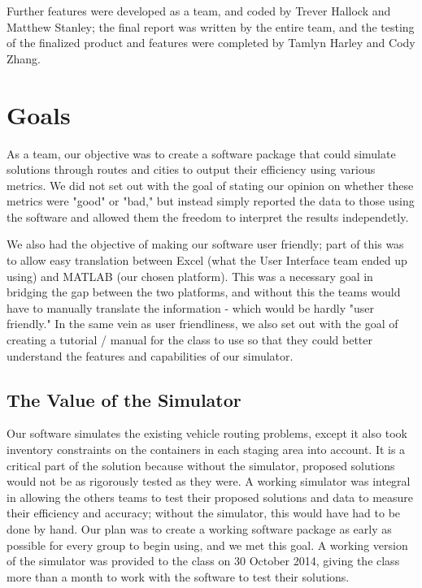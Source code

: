 \documentclass{article}
\begin{document}
Further features were developed as a team, and coded by Trever Hallock and Matthew Stanley; the final report was written by the entire team, and the testing of the finalized product and features were completed by Tamlyn Harley and Cody Zhang.


\section{Goals}

As a team, our objective was to create a software package that could simulate solutions through routes and cities to output their efficiency using various metrics.  We did not set out with the goal of stating our opinion on whether these metrics were "good" or "bad," but instead simply reported the data to those using the software and allowed them the freedom to interpret the results independetly. 

We also had the objective of making our software user friendly; part of this was to allow easy translation between Excel (what the User Interface team ended up using) and MATLAB (our chosen platform).  This was a necessary goal in bridging the gap between the two platforms, and without this the teams would have to manually translate the information - which would be hardly "user friendly."  In the same vein as user friendliness, we also set out with the goal of creating a tutorial / manual for the class to use so that they could better understand the features and capabilities of our simulator.


\subsection{The Value of the Simulator}

Our software simulates the existing vehicle routing problems, except it also took inventory constraints on the containers in each staging area into account. 
It is a critical part of the solution because without the simulator, proposed solutions would not be as rigorously tested as they were. 
A working simulator was integral in allowing the others teams to test their proposed solutions and data to measure their efficiency and accuracy; without the simulator, this would have had to be done by hand. 
Our plan was to create a working software package as early as possible for every group to begin using, and we met this goal. 
A working version of the simulator was provided to the class on 30 October 2014, giving the class more than a month to work with the software to test their solutions.
\end{document}
